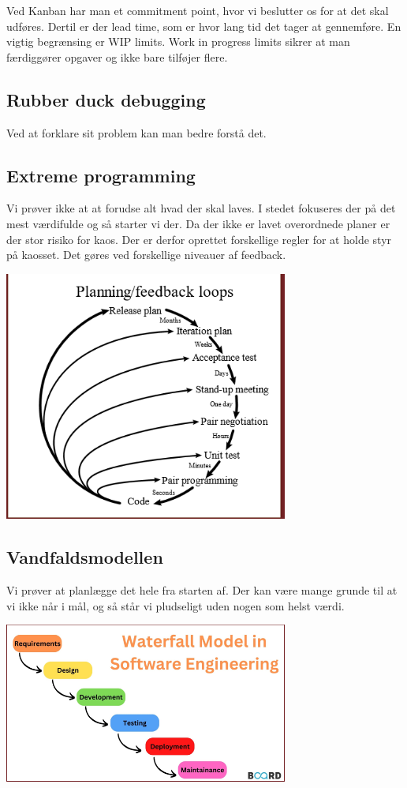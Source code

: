 Ved Kanban har man et commitment point, hvor vi beslutter os for at det skal udføres.
Dertil er der lead time, som er hvor lang tid det tager at gennemføre. En vigtig begrænsing er  WIP limits.
Work in progress limits sikrer at man færdiggører opgaver og ikke bare tilføjer flere.


\subsection{Rubber duck debugging}
Ved at forklare sit problem kan man bedre forstå det.

\subsection{Extreme programming}
Vi prøver ikke at at forudse alt hvad der skal laves. I stedet fokuseres
der på det mest værdifulde og så starter vi der. Da der ikke er lavet
overordnede planer er der stor risiko for kaos. Der er derfor oprettet
forskellige regler for at holde styr på kaosset. Det gøres ved forskellige
niveauer af feedback.


\begin{center}
	\includegraphics[width=0.7\textwidth]{Images/extreme.png}
\end{center}


\subsection{Vandfaldsmodellen}
Vi prøver at planlægge det hele fra starten af. Der kan være mange
grunde til at vi ikke når i mål, og så står vi pludseligt uden
nogen som helst værdi.

\begin{center}
	\includegraphics[width=0.7\textwidth]{Images/vandfald.png}
\end{center}
